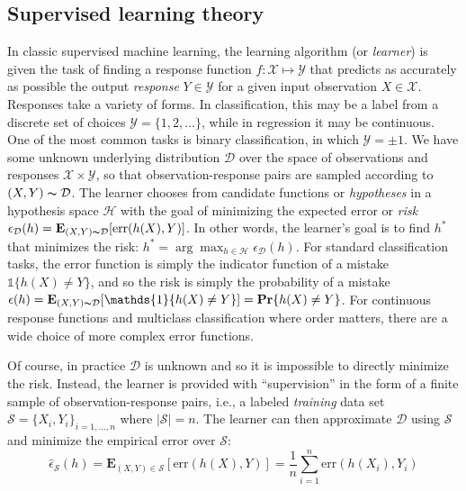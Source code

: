 \subsection{Supervised learning theory}

In classic supervised machine learning, the learning algorithm (or \textit{learner}) is given the task of finding a response function $f: \mathcal{X} \mapsto \mathcal{Y}$ that predicts as accurately as possible the output \textit{response} $Y \in \mathcal{Y}$ for a given input observation	 $X \in \mathcal{X}$. Responses take a variety of forms. In classification, this may be a label from a discrete set of choices $\mathcal{Y} = \{ 1, 2, \dots\}$, while in regression it may be continuous. One of the most common tasks is binary classification, in which $\mathcal{Y} = \pm1$. We have some unknown underlying distribution $\mathcal{D}$ over the space of observations and responses $\mathcal{X} \times \mathcal{Y}$, so that observation-response pairs are sampled according to $(X, Y) \thicksim \mathcal{D}$. The learner chooses from candidate functions or \textit{hypotheses} in a hypothesis space $\mathcal{H}$ with the goal of minimizing the expected error or \textit{risk} $\epsilon_\mathcal{D}(h) = \mathbf{E}_{(X,Y)\thicksim \mathcal{D}}[\mathrm{err}(h(X), Y)]$. In other words, the learner's goal is to find $h^\ast$ that minimizes the risk: $h^\ast = \arg\max_{h \in \mathcal{H}} \epsilon_{\mathcal{D}}(h)$. For standard classification tasks, the error function is simply the indicator function of a mistake $\mathds{1}\{h(X) \not= Y\}$, and so the risk is simply the probability of a mistake $\epsilon(h) = \mathbf{E}_{(X,Y)\thicksim \mathcal{D}}[\mathds{1}\{h(X) \not= Y\}] = \mathbf{Pr}\{h(X) \not= Y\}$. For continuous response functions and multiclass classification where order matters, there are a wide choice of more complex error functions.

Of course, in practice $\mathcal{D}$ is unknown and so it is impossible to directly minimize the risk. Instead, the learner is provided with ``supervision'' in the form of a finite sample of observation-response pairs, i.e., a labeled \textit{training} data set $\mathcal{S} = \{ X_i, Y_i \}_{i=1, \dots, n}$ where $|\mathcal{S}| = n$. The learner can then approximate $\mathcal{D}$ using $\mathcal{S}$ and minimize the empirical error over $\mathcal{S}$:
\[
\hat{\epsilon}_{\mathcal{S}}(h) = \mathbf{E}_{(X,Y) \in \mathcal{S}}[\mathrm{err}(h(X), Y)] = \frac{1}{n} \sum_{i=1}^n \mathrm{err}(h(X_i), Y_i)
\]

